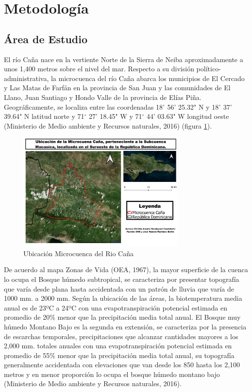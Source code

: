\documentclass[11pt,]{article}
\begin{document}
\section{Metodología}\label{metodologuxeda}

\subsection{Área de Estudio}\label{uxe1rea-de-estudio}

El río Caña nace en la vertiente Norte de la Sierra de Neiba
aproximadamente a unos 1,400 metros sobre el nivel del mar. Respecto a
su división político-administrativa, la microcuenca del río Caña abarca
los municipios de El Cercado y Las Matas de Farfán en la provincia de
San Juan y las comunidades de El Llano, Juan Santiago y Hondo Valle de
la provincia de Elías Piña. Geográficamente, se localiza entre las
coordenadas 18\(^\circ\) 56' 25.32" N y 18\(^\circ\) 37' 39.64" N
latitud norte y 71\(^\circ\) 27' 18.45" W y 71\(^\circ\) 44' 03.63" W
longitud oeste (Ministerio de Medio ambiente y Recursos naturales, 2016)
(figura \ref{mapacuenca}).

\begin{figure}
\centering
\includegraphics[width=0.75000\textwidth]{mapa_de_microcuenca_cana.jpg}
\caption{Ubicación Microcuenca del Rio Caña\label{mapacuenca}}
\end{figure}

De acuerdo al mapa Zonas de Vida (OEA, 1967), la mayor superficie de la
cuenca lo ocupa el Bosque húmedo subtropical, se caracteriza por
presentar topografía que varía desde plana hasta accidentada con un
patrón de lluvia que varía de 1000 mm. a 2000 mm. Según la ubicación de
las áreas, la biotemperatura media anual es de 23ºC a 24ºC con una
evapotranspiración potencial estimada en promedio de 20\% menor que la
precipitación media total anual. El Bosque muy húmedo Montano Bajo es la
segunda en extensión, se caracteriza por la presencia de escarchas
temporales, precipitaciones que alcanzar cantidades mayores a los 2,000
mm. totales anuales con una evapotranspiración potencial estimada en
promedio de 55\% menor que la precipitación media total anual, su
topografía generalmente accidentada con elevaciones que van desde los
850 hasta los 2,100 metros y en menor proporción lo ocupa el bosque
húmedo montano bajo (Ministerio de Medio ambiente y Recursos naturales,
2016).
\end{document}
